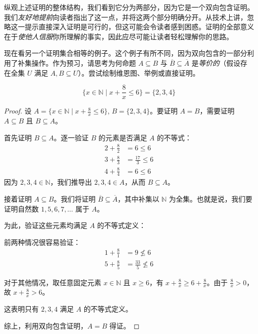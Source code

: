 纵观上述证明的整体结构，我们看到它分为两部分，因为它是一个双向包含证明。我们\emph{友好地提前}向读者指出了这一点，并将这两个部分明确分开。从技术上讲，忽略这一提示直接深入证明是可行的，但这可能会令读者感到困惑。证明的全部意义在于\emph{使他人信服}你所理解的事实，因此应尽可能让读者轻松理解你的思路。

现在看另一个证明集合相等的例子。这个例子有所不同，因为双向包含的一部分利用了补集操作。作为预习，请思考为何命题 $A \subseteq B$ 与 $\overline{B} \subseteq \overline{A}$ 是\emph{等价的}（假设存在全集 $U$ 满足 $A, B \subseteq U$）。尝试绘制维恩图、举例或直接证明。

\begin{proposition}
    \[\Big\{x \in \mathbb{N} \mid x + \frac{8}{x} \le 6\Big\} = \{2, 3, 4\}\]
\end{proposition}

\begin{proof}
    设 $A = \Big\{x \in \mathbb{N} \mid x + \frac{8}{x} \le 6\Big\}$, $B = \{2, 3, 4\}$。要证明 $A = B$，需要证明 $A \subseteq B$ 且 $B \subseteq A$。

    首先证明 $B \subseteq A$。逐一验证 $B$ 的元素是否满足 $A$ 的不等式：
    \begin{align*}
        2 + \frac{8}{2} &= 6 \le 6 \\
        3 + \frac{8}{3} &= \frac{17}{3} \le 6 \\
        4 + \frac{8}{4} &= 6 \le 6
    \end{align*}
    因为 $2,3,4 \in \mathbb{N}$，我们推导出 $2,3,4 \in A$，从而 $B \subseteq A$。

    接着证明 $A \subseteq B$。我们将证明 $\overline{B} \subseteq \overline{A}$，其中补集以 $\mathbb{N}$ 为全集。也就是说，我们要证明自然数 $1,5,6,7,\dots$ 属于 $A$。

    为此，验证这些元素均满足 $A$ 的不等式定义：

    前两种情况很容易验证：
    \begin{align*}
        1 + \frac{8}{1} &= 9 \nleq 6 \\
        5 + \frac{8}{5} &= \frac{33}{5} \nleq 6
    \end{align*}

    对于其他情况，取任意固定元素 $x \in \mathbb{N}$ 且 $x \ge 6$，有 $x + \frac{8}{x} \ge 6 + \frac{8}{x}$。由于 $\frac{8}{x} > 0$，故 $x + \frac{8}{x} > 6$。

    这表明只有 $2,3,4$ 满足 $A$ 的不等式定义。

    综上，利用双向包含证明，$A = B$ 得证。
\end{proof}

